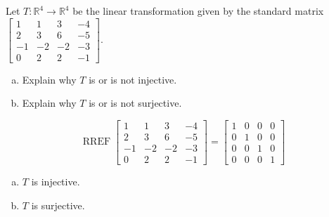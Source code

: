 
\begin{exerciseStatement}
 Let \(T:\mathbb{R}^ 4  \to \mathbb{R}^ 4 \) be the linear transformation given by the standard matrix \( \left[\begin{array}{cccc}
1 & 1 & 3 & -4 \\
2 & 3 & 6 & -5 \\
-1 & -2 & -2 & -3 \\
0 & 2 & 2 & -1
\end{array}\right] .\)
\begin{enumerate}[(a)]
\item Explain why \(T\) is or is not injective.
\item Explain why \(T\) is or is not surjective.
\end{enumerate}
    
\end{exerciseStatement}
    
\begin{exerciseAnswer} 


\[\operatorname{RREF} \left[\begin{array}{cccc}
1 & 1 & 3 & -4 \\
2 & 3 & 6 & -5 \\
-1 & -2 & -2 & -3 \\
0 & 2 & 2 & -1
\end{array}\right] = \left[\begin{array}{cccc}
1 & 0 & 0 & 0 \\
0 & 1 & 0 & 0 \\
0 & 0 & 1 & 0 \\
0 & 0 & 0 & 1
\end{array}\right] \]


\begin{enumerate}[(a)]
\item \(T\) is injective.
\item \(T\) is surjective.
\end{enumerate}
    
\end{exerciseAnswer}
    
